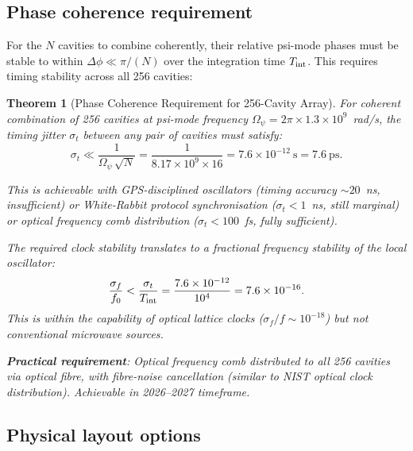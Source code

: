 \documentclass[11pt,twocolumn]{article}
\newcommand{\Opsi}{\Omega_\psi}
\newcommand{\ee}[1]{\times 10^{#1}}
\newtheorem{theorem}{Theorem}[section]
\begin{document}
\subsection{Phase coherence requirement}
\label{sec:phase_coherence}

For the $N$ cavities to combine coherently, their relative psi-mode phases
must be stable to within $\Delta\phi \ll \pi/(N)$ over the integration time
$T_{\rm int}$. This requires timing stability across all 256 cavities:

\begin{theorem}[Phase Coherence Requirement for 256-Cavity Array]
\label{thm:phase_coherence}
For coherent combination of 256 cavities at psi-mode frequency
$\Opsi = 2\pi\times1.3\ee{9}$~rad/s, the timing jitter $\sigma_t$
between any pair of cavities must satisfy:
\begin{equation}
\sigma_t \ll \frac{1}{\Opsi\,\sqrt{N}}
= \frac{1}{8.17\ee{9}\times16} = 7.6\ee{-12}~\text{s} = 7.6~\text{ps}.
\label{eq:timing_jitter}
\end{equation}

This is achievable with GPS-disciplined oscillators (timing accuracy
$\sim 20$~ns, insufficient) or White-Rabbit protocol synchronisation
($\sigma_t < 1$~ns, still marginal) or optical frequency comb
distribution ($\sigma_t < 100$~fs, fully sufficient).

The required clock stability translates to a fractional frequency
stability of the local oscillator:
\begin{equation}
\frac{\sigma_f}{f_0} < \frac{\sigma_t}{T_{\rm int}}
= \frac{7.6\ee{-12}}{10^4} = 7.6\ee{-16}.
\label{eq:clock_stability}
\end{equation}
This is within the capability of optical lattice clocks
($\sigma_f/f \sim 10^{-18}$) but not conventional microwave sources.

\textbf{Practical requirement}: Optical frequency comb distributed to
all 256 cavities via optical fibre, with fibre-noise cancellation
(similar to NIST optical clock distribution). Achievable in 2026--2027
timeframe.
\end{theorem}

\subsection{Physical layout options}
\label{sec:layout}
\end{document}
